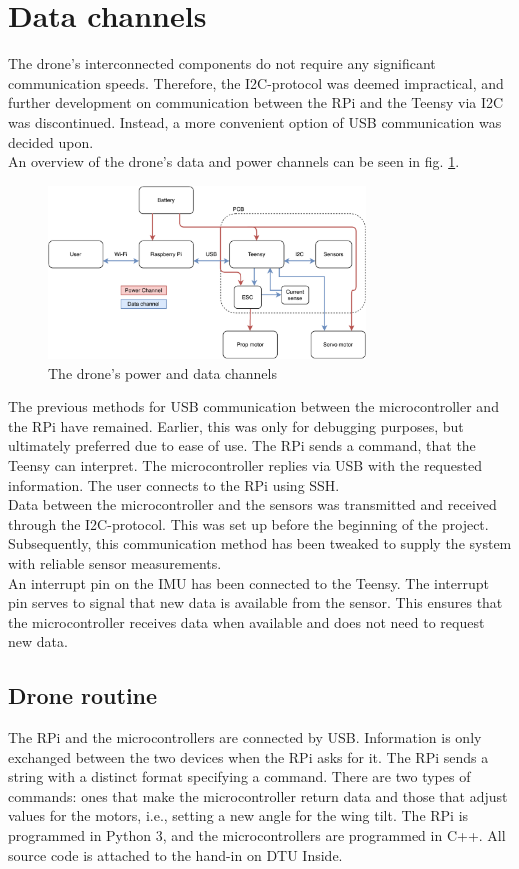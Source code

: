 \section{Data channels}
The drone's interconnected components do not require any significant communication speeds. Therefore, the I2C-protocol was deemed impractical, and further development on communication between the RPi and the Teensy via I2C was discontinued. Instead, a more convenient option of USB communication was decided upon.\\
An overview of the drone's data and power channels can be seen in fig. \ref{fig:blockdiagram}.
\begin{figure}[h!]
    \centering
    \includegraphics[width=0.75\textwidth]{figures/analysis/Propeller_Drone_Block_Diagram.pdf}
    \caption{The drone's power and data channels}
    \label{fig:blockdiagram}
\end{figure}
The previous methods for USB communication between the microcontroller and the RPi have remained. Earlier, this was only for debugging purposes, but ultimately preferred due to ease of use. The RPi sends a command, that the Teensy can interpret. The microcontroller replies via USB with the requested information. The user connects to the RPi using SSH.\\

Data between the microcontroller and the sensors was transmitted and received through the I2C-protocol. This was set up before the beginning of the project. Subsequently, this communication method has been tweaked to supply the system with reliable sensor measurements.\\ 
An interrupt pin on the IMU has been connected to the Teensy. The interrupt pin serves to signal that new data is available from the sensor. This ensures that the microcontroller receives data when available and does not need to request new data. 

\subsection{Drone routine}
The RPi and the microcontrollers are connected by USB. Information is only exchanged between the two devices when the RPi asks for it. The RPi sends a string with a distinct format specifying a command. There are two types of commands: ones that make the microcontroller return data and those that adjust values for the motors, i.e., setting a new angle for the wing tilt. The RPi is programmed in Python 3, and the microcontrollers are programmed in C++. All source code is attached to the hand-in on DTU Inside.


